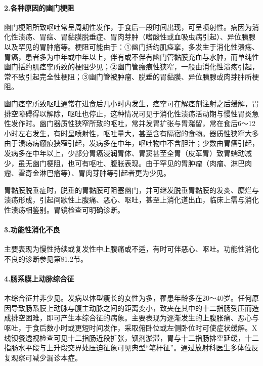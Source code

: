 \paragraph{2.各种原因的幽门梗阻}

幽门梗阻所致呕吐常呈周期性发作，于食后一段时间出现，可呈喷射性。病因为消化性溃疡、胃癌、胃黏膜脱垂症、胃肉芽肿（嗜酸性或血吸虫病引起）、异位胰腺以及罕见的胃肿瘤等。梗阻可能由于：①幽门括约肌痉挛，多发生于消化性溃疡、胃癌，患者多为中年或中年以上，伴有或不伴有幽门管黏膜充血与水肿，而单纯性幽门括约肌痉挛所致的梗阻少见；②幽门管瘢痕性狭窄，一般由消化性溃疡引起，常不致引起完全性梗阻；③幽门管被肿瘤、脱垂的胃黏膜、异位胰腺或肉芽肿所梗阻。

幽门痉挛所致呕吐通常在进食后几小时内发生，痉挛可在解痉剂注射之后缓解，胃排空障碍得以解除，呕吐也停止，这种情况可见于消化性溃疡活动期与慢性胃炎急性发作时。幽门器质性狭窄所致的呕吐，常并发胃扩张与胃潴留，常在食后6～12小时左右发生，有时呈喷射性，呕吐量大，甚至含有隔宿的食物。器质性狭窄大多由于溃疡病瘢痕狭窄引起，发病多在中年，呕吐物中不含胆汁；少数由胃癌引起，发病多在中年以上，少部分胃癌浸润胃体、胃窦甚至全胃（皮革胃）致胃蠕动减少，虽无幽门梗阻，也可有呕吐、腹胀表现。由于罕见的胃肿瘤（肉瘤、淋巴肉瘤、霍奇金淋巴瘤等）、胃肉芽肿等引起者更为少见。

胃黏膜脱垂症时，脱垂的胃黏膜可阻塞幽门，并可继发脱垂胃黏膜的发炎、糜烂与溃疡形成，引起间歇性上腹痛、恶心、呕吐，甚至上消化道出血，临床上需与消化性溃疡相鉴别。胃镜检查可明确诊断。

\paragraph{3.功能性消化不良}

主要表现为慢性持续或复发性中上腹痛或不适，有时可伴恶心、呕吐。功能性消化不良的诊断参见第81.2节。

\paragraph{4.肠系膜上动脉综合征}

本综合征并非少见。发病以体型瘦长的女性为多，罹患年龄多在20～40岁。任何原因导致肠系膜上动脉与腹主动脉之间的距离变小，致夹在其中的十二指肠受压而造成排空困难，即可产生本综合征的病象。主要表现为逐渐发生的上腹胀痛、恶心与呕吐，于食后数小时或更短时间发作，采取俯卧位或左侧卧位时可使症状缓解。X线钡餐透视检查可见十二指肠近段扩张，钡剂淤滞，胃与十二指肠排空延缓，十二指肠水平段与上升段交界处压迫征象可见典型“笔杆征”。通过放射科医生多体位反复观察可减少漏诊本症。

